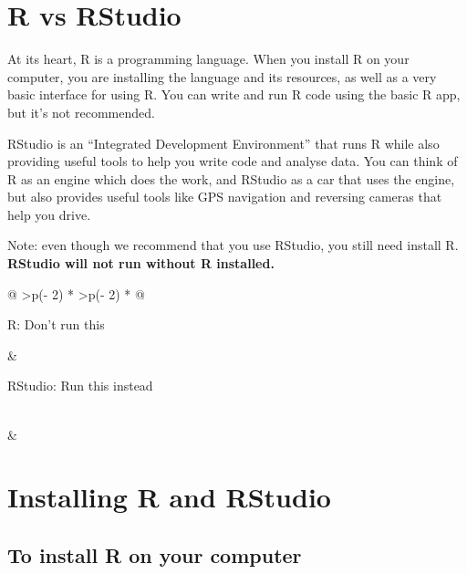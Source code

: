 \documentclass[
]{memoir}
\begin{document}
\hypertarget{r-vs-rstudio}{%
\section{R vs RStudio}\label{r-vs-rstudio}}

At its heart, R is a programming language. When you install R on your computer, you are installing the language and its resources, as well as a very basic interface for using R. You can write and run R code using the basic R app, but it's not recommended.

RStudio is an ``Integrated Development Environment'' that runs R while also providing useful tools to help you write code and analyse data. You can think of R as an engine which does the work, and RStudio as a car that uses the engine, but also provides useful tools like GPS navigation and reversing cameras that help you drive.

Note: even though we recommend that you use RStudio, you still need install R. \textbf{RStudio will not run without R installed.}

\begin{longtable}[]{@{}
  >{\centering\arraybackslash}p{(\columnwidth - 2\tabcolsep) * }
  >{\centering\arraybackslash}p{(\columnwidth - 2\tabcolsep) * }@{}}
\toprule
\begin{minipage}[b]{\linewidth}\centering
R: Don't run this
\end{minipage} & \begin{minipage}[b]{\linewidth}\centering
RStudio: Run this instead
\end{minipage} \\
\midrule
\endhead
& \\
\bottomrule
\end{longtable}

\hypertarget{installing-r-and-rstudio}{%
\section{Installing R and RStudio}\label{installing-r-and-rstudio}}

\hypertarget{to-install-r-on-your-computer}{%
\subsection{To install R on your computer}\label{to-install-r-on-your-computer}}
\end{document}
